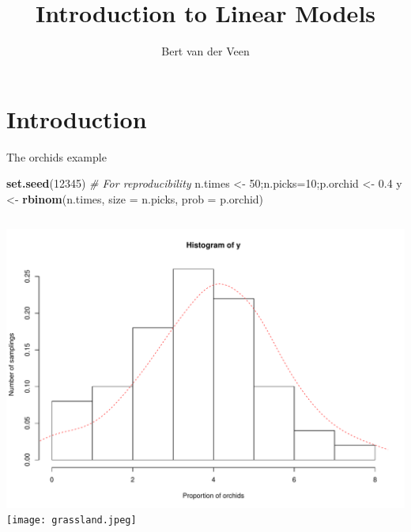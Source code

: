 \documentclass[
  ignorenonframetext,
]{beamer}
\title{Introduction to Linear Models}
\author{Bert van der Veen}
\date{}
\institute{Department of Mathematical Sciences, NTNU}
\newenvironment{Shaded}{\begin{snugshade}}{\end{snugshade}}
\newcommand{\AttributeTok}[1]{\textcolor[rgb]{0.13,0.29,0.53}{#1}}
\newcommand{\CommentTok}[1]{\textcolor[rgb]{0.56,0.35,0.01}{\textit{#1}}}
\newcommand{\DecValTok}[1]{\textcolor[rgb]{0.00,0.00,0.81}{#1}}
\newcommand{\FloatTok}[1]{\textcolor[rgb]{0.00,0.00,0.81}{#1}}
\newcommand{\FunctionTok}[1]{\textcolor[rgb]{0.13,0.29,0.53}{\textbf{#1}}}
\newcommand{\NormalTok}[1]{#1}
\newcommand{\OtherTok}[1]{\textcolor[rgb]{0.56,0.35,0.01}{#1}}
\newcommand{\columnsbegin}{\begin{columns}}
\newcommand{\columnsend}{\end{columns}}
\begin{document}
\frame{\titlepage}

\section{Introduction}\label{introduction}

\begin{frame}[fragile]{The orchids example}
\label{the-orchids-example}
\begin{codebox}

\begin{Shaded}
\begin{Highlighting}[]
\FunctionTok{set.seed}\NormalTok{(}\DecValTok{12345}\NormalTok{) }\CommentTok{\# For reproducibility}
\NormalTok{n.times }\OtherTok{\textless{}{-}} \DecValTok{50}\NormalTok{;n.picks}\OtherTok{=}\DecValTok{10}\NormalTok{;p.orchid }\OtherTok{\textless{}{-}} \FloatTok{0.4}
\NormalTok{y }\OtherTok{\textless{}{-}} \FunctionTok{rbinom}\NormalTok{(n.times, }\AttributeTok{size =}\NormalTok{ n.picks, }\AttributeTok{prob =}\NormalTok{ p.orchid) }
\end{Highlighting}
\end{Shaded}

\end{codebox}

\columnsbegin
{}

\includegraphics{IntroLM_files/figure-beamer/unnamed-chunk-2-1.pdf}
 \texttt{[image: grassland.jpeg]} \columnsend
\end{frame}
\end{document}
